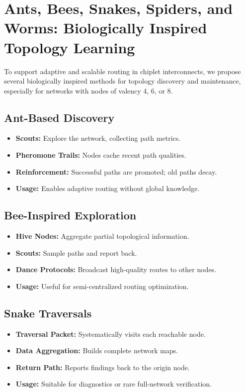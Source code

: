 \documentclass[../../../OAE-SPEC-MAIN.tex]{subfiles}
\begin{document}
\section{Ants, Bees, Snakes, Spiders, and Worms: Biologically Inspired Topology Learning}

To support adaptive and scalable routing in chiplet interconnects, we propose several biologically inspired methods for topology discovery and maintenance, especially for networks with nodes of valency 4, 6, or 8.

\subsection{Ant-Based Discovery}

\begin{itemize}
\item \textbf{Scouts:} Explore the network, collecting path metrics.
\item \textbf{Pheromone Trails:} Nodes cache recent path qualities.
\item \textbf{Reinforcement:} Successful paths are promoted; old paths decay.
\item \textbf{Usage:} Enables adaptive routing without global knowledge.
\end{itemize}

\subsection{Bee-Inspired Exploration}

\begin{itemize}
\item \textbf{Hive Nodes:} Aggregate partial topological information.
\item \textbf{Scouts:} Sample paths and report back.
\item \textbf{Dance Protocols:} Broadcast high-quality routes to other nodes.
\item \textbf{Usage:} Useful for semi-centralized routing optimization.
\end{itemize}

\subsection{Snake Traversals}

\begin{itemize}
\item \textbf{Traversal Packet:} Systematically visits each reachable node.
\item \textbf{Data Aggregation:} Builds complete network maps.
\item \textbf{Return Path:} Reports findings back to the origin node.
\item \textbf{Usage:} Suitable for diagnostics or rare full-network verification.
\end{itemize}
\end{document}
